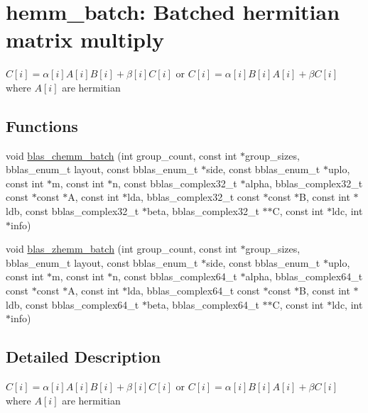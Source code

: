 \hypertarget{group__hemm__batch}{}\section{hemm\+\_\+batch\+: Batched hermitian matrix multiply}
\label{group__hemm__batch}


$ C[i] = \alpha[i] A[i] B[i] + \beta[i] C[i] $ or $ C[i] = \alpha[i] B[i] A[i] + \beta C[i] $ where $ A[i] $ are hermitian  


\subsection*{Functions}
\begin{DoxyCompactItemize}
\item 
void \hyperlink{group__hemm__batch_gac708e40d6650c0de054693950359c1e6}{blas\+\_\+chemm\+\_\+batch} (int group\+\_\+count, const int $\ast$group\+\_\+sizes, bblas\+\_\+enum\+\_\+t layout, const bblas\+\_\+enum\+\_\+t $\ast$side, const bblas\+\_\+enum\+\_\+t $\ast$uplo, const int $\ast$m, const int $\ast$n, const bblas\+\_\+complex32\+\_\+t $\ast$alpha, bblas\+\_\+complex32\+\_\+t const $\ast$const $\ast$A, const int $\ast$lda, bblas\+\_\+complex32\+\_\+t const $\ast$const $\ast$B, const int $\ast$ldb, const bblas\+\_\+complex32\+\_\+t $\ast$beta, bblas\+\_\+complex32\+\_\+t $\ast$$\ast$C, const int $\ast$ldc, int $\ast$info)
\item 
void \hyperlink{group__hemm__batch_gac72a9c3caf452b2ecded5f55399035f9}{blas\+\_\+zhemm\+\_\+batch} (int group\+\_\+count, const int $\ast$group\+\_\+sizes, bblas\+\_\+enum\+\_\+t layout, const bblas\+\_\+enum\+\_\+t $\ast$side, const bblas\+\_\+enum\+\_\+t $\ast$uplo, const int $\ast$m, const int $\ast$n, const bblas\+\_\+complex64\+\_\+t $\ast$alpha, bblas\+\_\+complex64\+\_\+t const $\ast$const $\ast$A, const int $\ast$lda, bblas\+\_\+complex64\+\_\+t const $\ast$const $\ast$B, const int $\ast$ldb, const bblas\+\_\+complex64\+\_\+t $\ast$beta, bblas\+\_\+complex64\+\_\+t $\ast$$\ast$C, const int $\ast$ldc, int $\ast$info)
\end{DoxyCompactItemize}


\subsection{Detailed Description}
$ C[i] = \alpha[i] A[i] B[i] + \beta[i] C[i] $ or $ C[i] = \alpha[i] B[i] A[i] + \beta C[i] $ where $ A[i] $ are hermitian 



